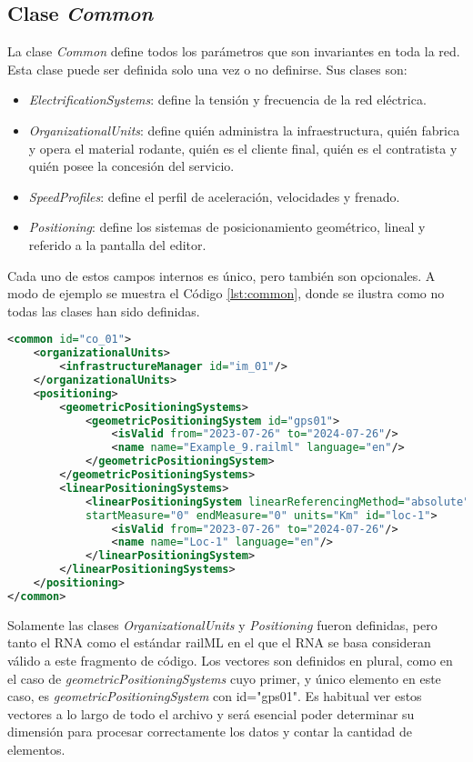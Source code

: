 \subsection{Clase \textit{Common}}
    \label{sec:common}

    La clase \textit{Common} define todos los parámetros que son invariantes en toda la red. Esta clase puede ser definida solo una vez o no definirse. Sus clases son:

    \begin{itemize}
        \item \textit{ElectrificationSystems}: define la tensión y frecuencia de la red eléctrica.
        \item \textit{OrganizationalUnits}: define quién administra la infraestructura, quién fabrica y opera el material rodante, quién es el cliente final, quién es el contratista y quién posee la concesión del servicio. 
        \item \textit{SpeedProfiles}: define el perfil de aceleración, velocidades y frenado.
        \item \textit{Positioning}: define los sistemas de posicionamiento geométrico, lineal y referido a la pantalla del editor.
    \end{itemize}

    Cada uno de estos campos internos es único, pero también son opcionales. A modo de ejemplo se muestra el Código \ref{lst:common}, donde se ilustra como no todas las clases han sido definidas.
    
    \begin{lstlisting}[language = XML, caption = Clase \textit{Common} , label = {lst:common}]
<common id="co_01">
    <organizationalUnits>
        <infrastructureManager id="im_01"/>
    </organizationalUnits>
    <positioning>
        <geometricPositioningSystems>
            <geometricPositioningSystem id="gps01">
                <isValid from="2023-07-26" to="2024-07-26"/>
                <name name="Example_9.railml" language="en"/>
            </geometricPositioningSystem>
        </geometricPositioningSystems>
        <linearPositioningSystems>
            <linearPositioningSystem linearReferencingMethod="absolute" 
            startMeasure="0" endMeasure="0" units="Km" id="loc-1">
                <isValid from="2023-07-26" to="2024-07-26"/>
                <name name="Loc-1" language="en"/>
            </linearPositioningSystem>
        </linearPositioningSystems>
    </positioning>
</common>
    \end{lstlisting}

    Solamente las clases \textit{OrganizationalUnits} y \textit{Positioning} fueron definidas, pero tanto el RNA como el estándar railML en el que el RNA se basa consideran válido a este fragmento de código. Los vectores son definidos en plural, como en el caso de \textit{geometricPositioningSystems} cuyo primer, y único elemento en este caso, es \textit{geometricPositioningSystem} con id="gps01". Es habitual ver estos vectores a lo largo de todo el archivo y será esencial poder determinar su dimensión para procesar correctamente los datos y contar la cantidad de elementos.